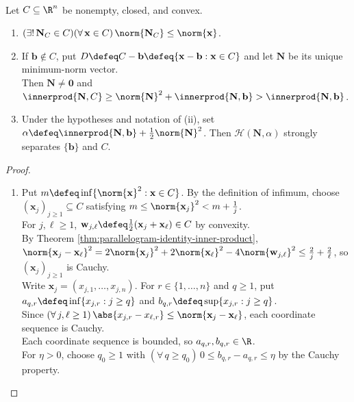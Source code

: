 \begin{theorem} \label{thm:nearest-point-and-point-separation-convex-set} \\
Let $C\subseteq\R^n$ be nonempty, closed, and convex.
\begin{enumerate}[label=(\roman*)]
\setlength{\itemsep}{0pt}
\item $(\exists!\,\mathbf{N}_C\in C)(\forall\,\mathbf{x}\in C)\,\norm{\mathbf{N}_C}\leq\norm{\mathbf{x}}$.
\item If $\mathbf{b}\notin C$, put $D\defeq C-\mathbf{b}\defeq\{\mathbf{x}-\mathbf{b}:\mathbf{x}\in C\}$ and let $\mathbf{N}$ be its unique minimum-norm vector.\\
Then $\mathbf{N}\neq\mathbf{0}$ and $\innerprod{\mathbf{N},C}\geq\norm{\mathbf{N}}^2+\innerprod{\mathbf{N},\mathbf{b}}>\innerprod{\mathbf{N},\mathbf{b}}$.
\item Under the hypotheses and notation of (ii), set $\alpha\defeq\innerprod{\mathbf{N},\mathbf{b}}+\frac{1}{2}\norm{\mathbf{N}}^2$. Then $\mathcal{H}(\mathbf{N},\alpha)$ strongly separates $\{\mathbf{b}\}$ and $C$.
\end{enumerate}
\begin{proof}
\begin{enumerate}[label=(\roman*)]
\setlength{\itemsep}{0pt}
\item Put $m\defeq\inf\{\norm{\mathbf{x}}^2:\mathbf{x}\in C\}$. By the definition of infimum, choose $(\mathbf{x}_j)_{j\geq1}\subseteq C$ satisfying $m\leq\norm{\mathbf{x}_j}^2<m+\frac{1}{j}$.\\
For $j,\ell\geq1$, $\mathbf{w}_{j,\ell}\defeq\frac{1}{2}(\mathbf{x}_j+\mathbf{x}_\ell)\in C$ by convexity.\\
By Theorem \ref{thm:parallelogram-identity-inner-product}, $\norm{\mathbf{x}_j-\mathbf{x}_\ell}^2=2\norm{\mathbf{x}_j}^2+2\norm{\mathbf{x}_\ell}^2-4\norm{\mathbf{w}_{j,\ell}}^2\leq\frac{2}{j}+\frac{2}{\ell}$, so $(\mathbf{x}_j)_{j\geq1}$ is Cauchy.\\
Write $\mathbf{x}_j=(x_{j,1},\ldots,x_{j,n})$. For $r\in\{1,\ldots,n\}$ and $q\geq1$, put $a_{q,r}\defeq\inf\{x_{j,r}:j\geq q\}$ and $b_{q,r}\defeq\sup\{x_{j,r}:j\geq q\}$.\\
Since $(\forall\,j,\ell\geq1)\,\abs{x_{j,r}-x_{\ell,r}}\leq\norm{\mathbf{x}_j-\mathbf{x}_\ell}$, each coordinate sequence is Cauchy.\\
Each coordinate sequence is bounded, so $a_{q,r},b_{q,r}\in\R$.\\
For $\eta>0$, choose $q_0\geq1$ with $(\forall\,q\geq q_0)\,0\leq b_{q,r}-a_{q,r}\leq\eta$ by the Cauchy property.\\

\end{enumerate}
\end{proof}
\end{theorem}

